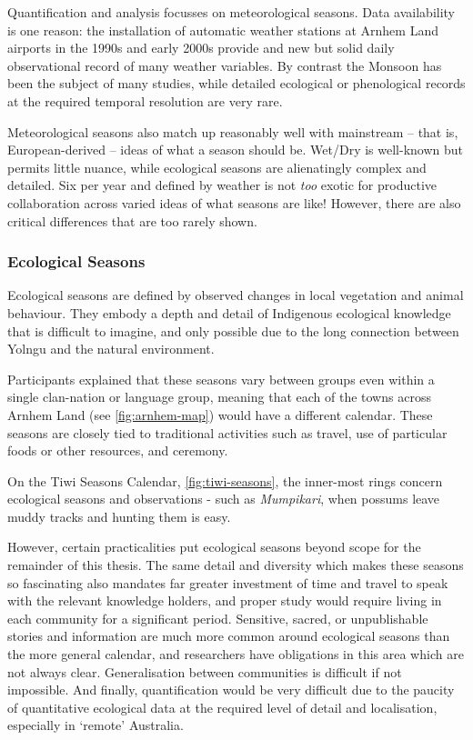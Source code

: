 Quantification and analysis focusses on meteorological seasons.
Data availability is one reason:  the installation of automatic weather
stations at Arnhem Land airports in the 1990s and early 2000s provide
and new but solid daily observational record of many weather variables.
By contrast the Monsoon has been the subject of many studies, while
detailed ecological or phenological records at the required temporal
resolution are very rare.

Meteorological seasons also match up reasonably well with mainstream --
that is, European-derived -- ideas of what a season should be.  Wet/Dry
is well-known but permits little nuance, while ecological seasons are
alienatingly complex and detailed.  Six per year and defined by weather
is not \emph{too} exotic for productive collaboration across varied
ideas of what seasons are like!
%
However, there are also critical differences that are too rarely shown.







\subsubsection{Ecological Seasons}
Ecological seasons are defined by observed changes in local vegetation
and animal behaviour.  They embody a depth and detail of Indigenous
ecological knowledge that is difficult to imagine, and only possible
due to the long connection between Yolngu and the natural environment.

Participants explained that these seasons vary between groups even within
a single clan-nation or language group, meaning that each of the towns
across Arnhem Land (see \cref{fig:arnhem-map}) would have a different
calendar. These seasons are closely tied to traditional activities such as
travel, use of particular foods or other resources, and ceremony.

On the Tiwi Seasons Calendar, \cref{fig:tiwi-seasons}, the inner-most
rings concern ecological seasons and observations - such as
\textit{Mumpikari}, when possums leave muddy tracks and hunting them is easy.

However, certain practicalities put ecological seasons beyond scope
for the remainder of this thesis.
The same detail and diversity which makes these seasons so fascinating
also mandates far greater investment of time and travel to speak
with the relevant knowledge holders, and proper study would require
living in each community for a significant period.
Sensitive, sacred, or unpublishable stories and information are much more
common around ecological seasons than the more general calendar,
and researchers have obligations in this area which are not always clear.
Generalisation between communities is difficult if not impossible.
And finally, quantification would be very difficult due to the paucity
of quantitative ecological data at the required level of detail
and localisation, especially in `remote' Australia.

